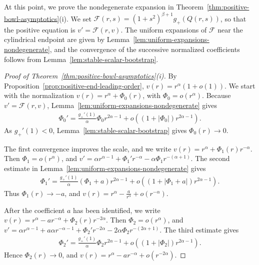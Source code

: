 \documentclass{amsart}
\theoremstyle{plain}
\theoremstyle{mainintrothm}
\theoremstyle{definition}
\begin{document}
	
	At this point, we prove the nondegenerate expansion in
	Theorem~\ref{thm:positive-bowl-asymptotics}\textup{(i)}.  We set
	$\mathcal F(r,s)=(1+s^2)^{\beta+1}g_+(Q(r,s))$, so that the positive equation
	is $v'=\mathcal F(r,v)$.  The uniform expansions of $\mathcal F$ near the
	cylindrical endpoint are given by
	Lemma~\ref{lem:uniform-expansions-nondegenerate}, and the convergence of the
	successive normalized coefficients follows from
	Lemma~\ref{lem:stable-scalar-bootstrap}.
	
	\begin{proof}[Proof of Theorem~\ref{thm:positive-bowl-asymptotics}\textup{(i)}]
		By Proposition~\ref{prop:positive-end-leading-order},
		$v(r)=r^\alpha(1+o(1))$.  We start with the normalization
		$v(r)=r^\alpha+\Phi_0(r)$, with $\Phi_0=o(r^\alpha)$.  Because
		$v'=\mathcal F(r,v)$, Lemma~\ref{lem:uniform-expansions-nondegenerate}
		gives
		\begin{align*}
			\Phi_0'
			=
			\frac{g_+'(1)}{\alpha}\Phi_0 r^{2\alpha-1}
			+
			o\!\left((1+|\Phi_0|)r^{2\alpha-1}\right).
		\end{align*}
		As $g_+'(1)<0$, Lemma~\ref{lem:stable-scalar-bootstrap} gives
		$\Phi_0(r)\to0$.
		
		\medskip
		
		The first convergence improves the scale, and we write
		$v(r)=r^\alpha+\Phi_1(r)r^{-\alpha}$.  Then
		$\Phi_1=o(r^\alpha)$, and
		$v'=\alpha r^{\alpha-1}+\Phi_1'r^{-\alpha}-\alpha\Phi_1r^{-(\alpha+1)}$.  The second estimate in Lemma~\ref{lem:uniform-expansions-nondegenerate} gives
		\begin{align*}
			\Phi_1'
			=
			\frac{g_+'(1)}{\alpha}(\Phi_1+a)r^{2\alpha-1}
			+
			o\!\left((1+|\Phi_1+a|)r^{2\alpha-1}\right).
		\end{align*}
		Thus $\Phi_1(r)\to-a$, and
		$v(r)=r^\alpha-\frac{a}{r^\alpha}+o(r^{-\alpha})$.
		
		\medskip
		
		After the coefficient $a$ has been identified, we write
		$v(r)=r^\alpha-ar^{-\alpha}+\Phi_2(r)r^{-2\alpha}$.
		Then $\Phi_2=o(r^\alpha)$, and
		$v'=\alpha r^{\alpha-1}+a\alpha r^{-\alpha-1}+\Phi_2'r^{-2\alpha}-
		2\alpha\Phi_2r^{-(2\alpha+1)}$.  The third estimate gives
		\begin{align*}
			\Phi_2'
			=
			\frac{g_+'(1)}{\alpha}\Phi_2 r^{2\alpha-1}
			+
			o\!\left((1+|\Phi_2|)r^{2\alpha-1}\right).
		\end{align*}
		Hence $\Phi_2(r)\to0$, and
		$v(r)=r^\alpha-ar^{-\alpha}+o(r^{-2\alpha})$.
		

\end{proof}
\end{document}
